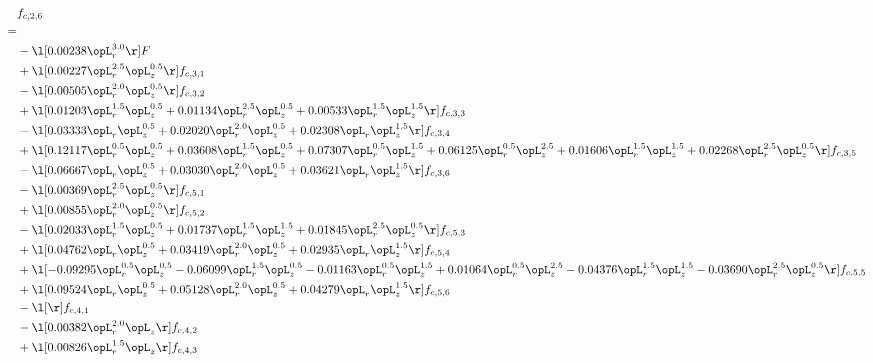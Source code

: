 \begin{alignat}{2} 
\label{eq:f_26_2} 
& f_{c,2,6} \nonumber \\ 
 = \\ 
& - \l[  0.00238 \opL_r^{3.0}  \r] F \nonumber \\ 
& + \l[  0.00227 \opL_r^{2.5} \opL_z^{0.5}  \r] f_{c,3,1} \nonumber \\ 
& - \l[  0.00505 \opL_r^{2.0} \opL_z^{0.5}  \r] f_{c,3,2} \nonumber \\ 
& + \l[  0.01203 \opL_r^{1.5} \opL_z^{0.5} +  0.01134 \opL_r^{2.5} \opL_z^{0.5} +  0.00533 \opL_r^{1.5} \opL_z^{1.5}  \r] f_{c,3,3} \nonumber \\ 
& - \l[  0.03333 \opL_r \opL_z^{0.5} +  0.02020 \opL_r^{2.0} \opL_z^{0.5} +  0.02308 \opL_r \opL_z^{1.5}  \r] f_{c,3,4} \nonumber \\ 
& + \l[  0.12117 \opL_r^{0.5} \opL_z^{0.5} +  0.03608 \opL_r^{1.5} \opL_z^{0.5} +  0.07307 \opL_r^{0.5} \opL_z^{1.5} +  0.06125 \opL_r^{0.5} \opL_z^{2.5} +  0.01606 \opL_r^{1.5} \opL_z^{1.5} +  0.02268 \opL_r^{2.5} \opL_z^{0.5}  \r] f_{c,3,5} \nonumber \\ 
& - \l[  0.06667 \opL_r \opL_z^{0.5} +  0.03030 \opL_r^{2.0} \opL_z^{0.5} +  0.03621 \opL_r \opL_z^{1.5}  \r] f_{c,3,6} \nonumber \\ 
& - \l[  0.00369 \opL_r^{2.5} \opL_z^{0.5}  \r] f_{c,5,1} \nonumber \\ 
& + \l[  0.00855 \opL_r^{2.0} \opL_z^{0.5}  \r] f_{c,5,2} \nonumber \\ 
& - \l[  0.02033 \opL_r^{1.5} \opL_z^{0.5} +  0.01737 \opL_r^{1.5} \opL_z^{1.5} +  0.01845 \opL_r^{2.5} \opL_z^{0.5}  \r] f_{c,5,3} \nonumber \\ 
& + \l[  0.04762 \opL_r \opL_z^{0.5} +  0.03419 \opL_r^{2.0} \opL_z^{0.5} +  0.02935 \opL_r \opL_z^{1.5}  \r] f_{c,5,4} \nonumber \\ 
& + \l[  -0.09295 \opL_r^{0.5} \opL_z^{0.5}   -0.06099 \opL_r^{1.5} \opL_z^{0.5}   -0.01163 \opL_r^{0.5} \opL_z^{1.5} +  0.01064 \opL_r^{0.5} \opL_z^{2.5}   -0.04376 \opL_r^{1.5} \opL_z^{1.5}   -0.03690 \opL_r^{2.5} \opL_z^{0.5}  \r] f_{c,5,5} \nonumber \\ 
& + \l[  0.09524 \opL_r \opL_z^{0.5} +  0.05128 \opL_r^{2.0} \opL_z^{0.5} +  0.04279 \opL_r \opL_z^{1.5}  \r] f_{c,5,6} \nonumber \\ 
& - \l[  \r] f_{c,4,1} \nonumber \\ 
& - \l[  0.00382 \opL_r^{2.0} \opL_z  \r] f_{c,4,2} \nonumber \\ 
& + \l[  0.00826 \opL_r^{1.5} \opL_z  \r] f_{c,4,3} \nonumber \\ 

\end{alignat}
